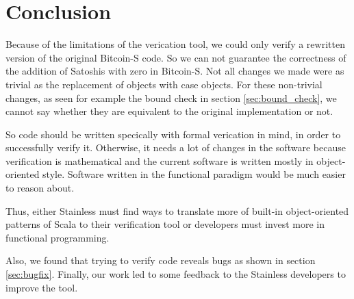 \chapter{Conclusion}
\label{chap:conclusion}

Because of the limitations of the verication tool, we could only verify a rewritten version of the original Bitcoin-S code.
So we can not guarantee the correctness of the addition of Satoshis with zero in Bitcoin-S.
Not all changes we made were as trivial as the replacement of objects with case objects.
For these non-trivial changes, as seen for example the bound check in section \ref{sec:bound_check}, we cannot say whether they are equivalent to the original implementation or not.

So code should be written specically with formal verication in mind, in order to successfully verify it.
Otherwise, it needs a lot of changes in the software because verification is mathematical and the current software is written mostly in object-oriented style.
Software written in the functional paradigm would be much easier to reason about.

Thus, either Stainless must find ways to translate more of built-in object-oriented patterns of Scala to their verification tool or developers must invest more in functional programming.

Also, we found that trying to verify code reveals bugs as shown in section \ref{sec:bugfix}.
Finally, our work led to some feedback to the Stainless developers to improve the tool.
